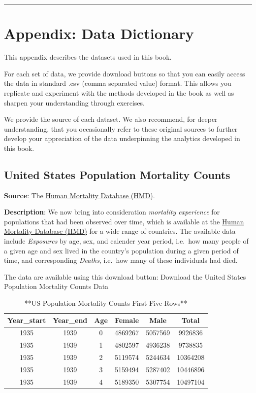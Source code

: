\documentclass[
]{book}
\begin{document}
\begin{center}\rule{0.5\linewidth}{0.5pt}\end{center}

\hypertarget{appendix-data-dictionary}{%
\chapter{Appendix: Data Dictionary}\label{appendix-data-dictionary}}

This appendix describes the datasets used in this book.

For each set of data, we provide download buttons so that you can easily access the data in standard .csv (comma separated value) format. This allows you replicate and experiment with the methods developed in the book as well as sharpen your understanding through exercises.

We provide the source of each dataset. We also recommend, for deeper understanding, that you occasionally refer to these original sources to further develop your appreciation of the data underpinning the analytics developed in this book.

\hypertarget{Sec:DataUSPoPCounts}{%
\section{United States Population Mortality Counts}\label{Sec:DataUSPoPCounts}}

\textbf{Source}: The \href{https://www.mortality.org}{Human Mortality Database (HMD)}.

\textbf{Description}: We now bring into consideration \emph{mortality experience} for populations that had been observed over time, which is available at the \href{https://www.mortality.org}{Human Mortality Database (HMD)} for a wide range of countries. The available data include \emph{Exposures} by age, sex, and calender year period, i.e.~how many people of a given age and sex lived in the country's population during a given period of time, and corresponding \emph{Deaths}, i.e.~how many of these individuals had died.

The data are available using this download button:
Download the United States Population Mortality Counts Data

\begin{table}

\caption{\label{tab:unnamed-chunk-14}**US Population Mortality Counts First Five Rows**}
\centering
\begin{tabular}[t]{c|c|c|c|c|c}
\hline
Year\_start & Year\_end & Age & Female & Male & Total\\
\hline
1935 & 1939 & 0 & 4869267 & 5057569 & 9926836\\
\hline
1935 & 1939 & 1 & 4802597 & 4936238 & 9738835\\
\hline
1935 & 1939 & 2 & 5119574 & 5244634 & 10364208\\
\hline
1935 & 1939 & 3 & 5159494 & 5287402 & 10446896\\
\hline
1935 & 1939 & 4 & 5189350 & 5307754 & 10497104\\
\hline
\end{tabular}
\end{table}
\end{document}

